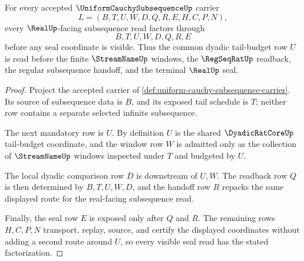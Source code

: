 \begin{theorem}
\label{thm:uniform-cauchy-subsequence-tail-budget}
For every accepted $\UniformCauchySubsequenceUp$ carrier
$$
L=(B,T,U,W,D,Q,R,E,H,C,P,N),
$$
every $\RealUp$-facing subsequence read factors through
$$
B,T,U,W,D,Q,R,E
$$
before any seal coordinate is visible. Thus the common dyadic tail-budget row $U$ is read before the finite $\StreamNameUp$ windows, the $\RegSeqRatUp$ readback, the regular subsequence handoff, and the terminal $\RealUp$ seal.
\end{theorem}
\begin{proof}
Project the accepted carrier of \autoref{def:uniform-cauchy-subsequence-carrier}. Its source of subsequence data is $B$, and its exposed tail schedule is $T$; neither row contains a separate selected infinite subsequence.

The next mandatory row is $U$. By definition $U$ is the shared $\DyadicRatCoreUp$ tail-budget coordinate, and the window row $W$ is admitted only as the collection of $\StreamNameUp$ windows inspected under $T$ and budgeted by $U$.

The local dyadic comparison row $D$ is downstream of $U,W$. The readback row $Q$ is then determined by $B,T,U,W,D$, and the handoff row $R$ repacks the same displayed route for the real-facing subsequence read.

Finally, the seal row $E$ is exposed only after $Q$ and $R$. The remaining rows $H,C,P,N$ transport, replay, source, and certify the displayed coordinates without adding a second route around $U$, so every visible seal read has the stated factorization.
\end{proof}

